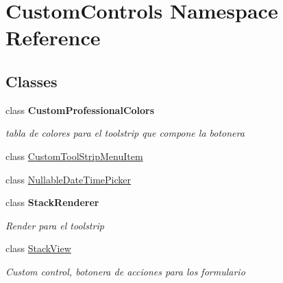 \hypertarget{namespace_custom_controls}{}\section{Custom\+Controls Namespace Reference}
\label{namespace_custom_controls}
\subsection*{Classes}
\begin{DoxyCompactItemize}
\item 
class {\bfseries Custom\+Professional\+Colors}
\begin{DoxyCompactList}\small\item\em tabla de colores para el toolstrip que compone la botonera \end{DoxyCompactList}\item 
class \hyperlink{class_custom_controls_1_1_custom_tool_strip_menu_item}{Custom\+Tool\+Strip\+Menu\+Item}
\item 
class \hyperlink{class_custom_controls_1_1_nullable_date_time_picker}{Nullable\+Date\+Time\+Picker}
\item 
class {\bfseries Stack\+Renderer}
\begin{DoxyCompactList}\small\item\em Render para el toolstrip \end{DoxyCompactList}\item 
class \hyperlink{class_custom_controls_1_1_stack_view}{Stack\+View}
\begin{DoxyCompactList}\small\item\em Custom control, botonera de acciones para los formulario \end{DoxyCompactList}\end{DoxyCompactItemize}
